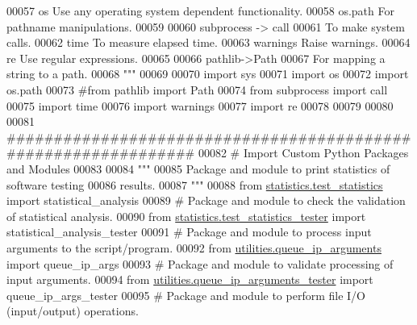 \begin{DoxyCode}
00057 \textcolor{stringliteral}{    os          Use any operating system dependent functionality.}
00058 \textcolor{stringliteral}{    os.path     For pathname manipulations.}
00059 \textcolor{stringliteral}{}
00060 \textcolor{stringliteral}{    subprocess -> call}
00061 \textcolor{stringliteral}{                To make system calls.}
00062 \textcolor{stringliteral}{    time        To measure elapsed time.}
00063 \textcolor{stringliteral}{    warnings    Raise warnings.}
00064 \textcolor{stringliteral}{    re          Use regular expressions.}
00065 \textcolor{stringliteral}{}
00066 \textcolor{stringliteral}{    pathlib->Path}
00067 \textcolor{stringliteral}{                For mapping a string to a path.}
00068 \textcolor{stringliteral}{"""}
00069 
00070 \textcolor{keyword}{import} sys
00071 \textcolor{keyword}{import} os
00072 \textcolor{keyword}{import} os.path
00073 \textcolor{comment}{#from pathlib import Path}
00074 \textcolor{keyword}{from} subprocess \textcolor{keyword}{import} call
00075 \textcolor{keyword}{import} time
00076 \textcolor{keyword}{import} warnings
00077 \textcolor{keyword}{import} re
00078 
00079 
00080 
00081 \textcolor{comment}{###############################################################}
00082 \textcolor{comment}{#   Import Custom Python Packages and Modules}
00083 
00084 \textcolor{stringliteral}{"""}
00085 \textcolor{stringliteral}{    Package and module to print statistics of software testing}
00086 \textcolor{stringliteral}{        results.}
00087 \textcolor{stringliteral}{"""}
00088 \textcolor{keyword}{from} \hyperlink{namespacestatistics_1_1test__statistics}{statistics.test\_statistics} \textcolor{keyword}{import} statistical\_analysis
00089 \textcolor{comment}{# Package and module to check the validation of statistical analysis.}
00090 \textcolor{keyword}{from} \hyperlink{namespacestatistics_1_1test__statistics__tester}{statistics.test\_statistics\_tester} \textcolor{keyword}{import} statistical\_analysis\_tester
00091 \textcolor{comment}{# Package and module to process input arguments to the script/program.}
00092 \textcolor{keyword}{from} \hyperlink{namespaceutilities_1_1queue__ip__arguments}{utilities.queue\_ip\_arguments} \textcolor{keyword}{import} queue\_ip\_args
00093 \textcolor{comment}{# Package and module to validate processing of input arguments.}
00094 \textcolor{keyword}{from} \hyperlink{namespaceutilities_1_1queue__ip__arguments__tester}{utilities.queue\_ip\_arguments\_tester} \textcolor{keyword}{import} queue\_ip\_args\_tester
00095 \textcolor{comment}{# Package and module to perform file I/O (input/output) operations.}

\end{DoxyCode}
